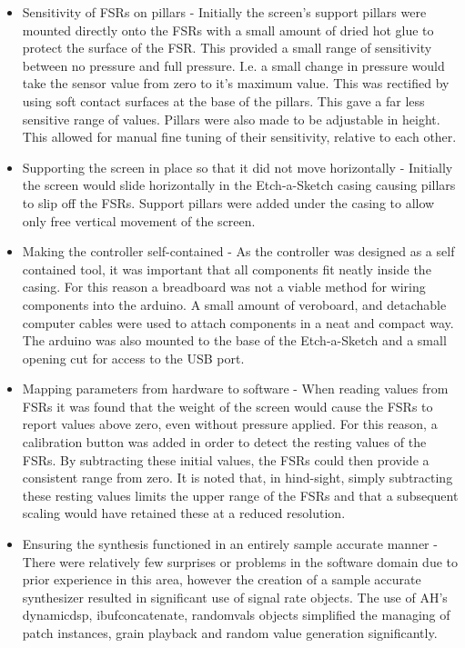 \documentclass[titlepage]{scrartcl}
\begin{document}
\begin{itemize}
    \item Sensitivity of FSRs on pillars - Initially the screen's support
        pillars were mounted directly onto the FSRs with a small amount of
        dried hot glue to protect the surface of the FSR. This provided a small
        range of sensitivity between no pressure and full pressure. I.e. a
        small change in pressure would take the sensor value from zero to it's
        maximum value. This was rectified by using soft contact surfaces at the
        base of the pillars. This gave a far less sensitive range of values.
        Pillars were also made to be adjustable in height. This allowed for
        manual fine tuning of their sensitivity, relative to each other.
    \item Supporting the screen in place so that it did not move horizontally -
        Initially the screen would slide horizontally in the Etch-a-Sketch
        casing causing pillars to slip off the FSRs. Support pillars were added
        under the casing to allow only free vertical movement of the screen.
    \item Making the controller self-contained - As the controller was designed
        as a self contained tool, it was important that all components fit
        neatly inside the casing. For this reason a breadboard was not a
        viable method for wiring components into the arduino. A small amount of
        veroboard, and detachable computer cables were used to attach
        components in a neat and compact way. The arduino was also mounted to
        the base of the Etch-a-Sketch and a small opening cut for access to the
        USB port.
    \item Mapping parameters from hardware to software - When reading values
        from FSRs it was found that the weight of the screen would cause the
        FSRs to report values above zero, even without pressure applied. For
        this reason, a calibration button was added in order to detect the
        resting values of the FSRs. By subtracting these initial values, the
        FSRs could then provide a consistent range from zero. It is noted that,
        in hind-sight, simply subtracting these resting values limits the upper
        range of the FSRs and that a subsequent scaling would have retained
        these at a reduced resolution.
    \item Ensuring the synthesis functioned in an entirely sample accurate
        manner - There were relatively few surprises or problems in the software domain due
        to prior experience in this area, however the creation of a sample
        accurate synthesizer resulted in significant use of signal rate
        objects. The use of AH's dynamicdsp, ibufconcatenate, randomvals
        objects simplified the managing of patch instances, grain playback and
        random value generation significantly.
\end{itemize}

\printbibliography
\end{document}
